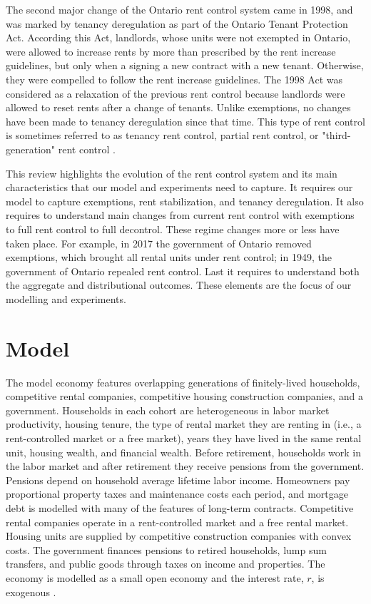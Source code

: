 \documentclass[parskip=full]{article}
\begin{document}
The second major change of the Ontario rent control system came in 1998, and was marked by tenancy deregulation as part of the Ontario Tenant Protection Act. According this Act, landlords, whose units were not exempted in Ontario, were allowed to increase rents by more than prescribed by the rent increase guidelines, but only when a signing a new contract with a new tenant. Otherwise, they were compelled to follow the rent increase guidelines. The 1998 Act was considered as a relaxation of the previous rent control because landlords were allowed to reset rents after a change of tenants. Unlike exemptions, no changes have been made to tenancy deregulation since that time. This type of rent control is sometimes referred to as tenancy rent control, partial rent control, or "third-generation" rent control \citep{arnott-2003}. 

This review highlights the evolution of the rent control system and its main characteristics that our model and experiments need to capture. It requires our model to capture exemptions, rent stabilization, and tenancy deregulation. It also requires to understand main changes from current rent control with exemptions to full rent control to full decontrol. These regime changes more or less have taken place. For example, in 2017 the government of Ontario removed exemptions, which brought all rental units under rent control; in 1949, the government of Ontario repealed rent control. Last it requires to understand both the aggregate and distributional outcomes. These elements are the focus of our modelling and experiments. 

\section{Model}\label{sec:model}

The model economy features overlapping generations of finitely-lived households, competitive rental companies, competitive housing construction companies, and a government. Households in each cohort are heterogeneous in labor market productivity, housing tenure, the type of rental market they are renting in (i.e., a rent-controlled market or a free market), years they have lived in the same rental unit, housing wealth, and financial wealth. Before retirement, households work in the labor market and after retirement they receive pensions from the government. Pensions depend on household average lifetime labor income. Homeowners pay proportional property taxes and maintenance costs each period, and mortgage debt is modelled with many of the features of long-term contracts. Competitive rental companies operate in a rent-controlled market and a free rental market. Housing units are supplied by competitive construction companies with convex costs. The government finances pensions to retired households, lump sum transfers, and public goods through taxes on income and properties. The economy is modelled as a small open economy and the interest rate, $r$, is exogenous \citep{sommeretal-2013,arslanetal-2015,sommersullivan-2017,kaplanetal-2019}. 
\end{document}
